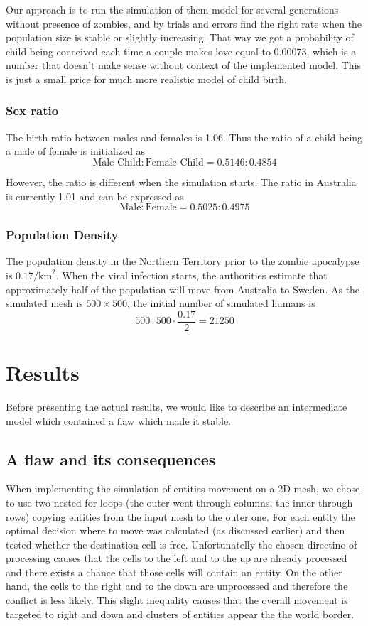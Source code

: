 \documentclass[a4paper]{article}
\begin{document}
Our approach is to run the simulation of them model for several generations without presence of zombies, and by trials and errors find the right rate when the population size is stable or slightly increasing.
That way we got a probability of child being conceived each time a couple makes love equal to 0.00073, which is a number that doesn't make sense without context of the implemented model.
This is just a small price for much more realistic model of child birth.

\subsubsection{Sex ratio}

The birth ratio between males and females is 1.06. \cite{cia}
Thus the ratio of a child being a male of female is initialized as
$$ \text{Male Child} : \text{Female Child} = 0.5146 : 0.4854 $$

However, the ratio is different when the simulation starts.
The ratio in Australia is currently 1.01 and can be expressed as \cite{cia}
$$ \text{Male} : \text{Female} = 0.5025 : 0.4975 $$

\subsubsection{Population Density}

The population density in the Northern Territory prior to the zombie apocalypse is $0.17/\text{km}^2$. \cite{northernterritory}
When the viral infection starts, the authorities estimate that approximately half of the population will move from Australia to Sweden. \cite{project}
As the simulated mesh is $500 \times 500$, the initial number of simulated humans is
$$ 500 \cdot 500 \cdot \frac{0.17}{2} = 21250 $$

\section{Results}

Before presenting the actual results, we would like to describe an intermediate model which contained a flaw which made it stable.

\subsection{A flaw and its consequences}

When implementing the simulation of entities movement on a 2D mesh, we chose to use two nested for loops (the outer went through columns, the inner through rows) copying entities from the input mesh to the outer one.
For each entity the optimal decision where to move was calculated (as discussed earlier) and then tested whether the destination cell is free.
Unfortunatelly the chosen directino of processing causes that the cells to the left and to the up are already processed and there exists a chance that those cells will contain an entity.
On the other hand, the cells to the right and to the down are unprocessed and therefore the conflict is less likely.
This slight inequality causes that the overall movement is targeted to right and down and clusters of entities appear the the world border.
\end{document}
